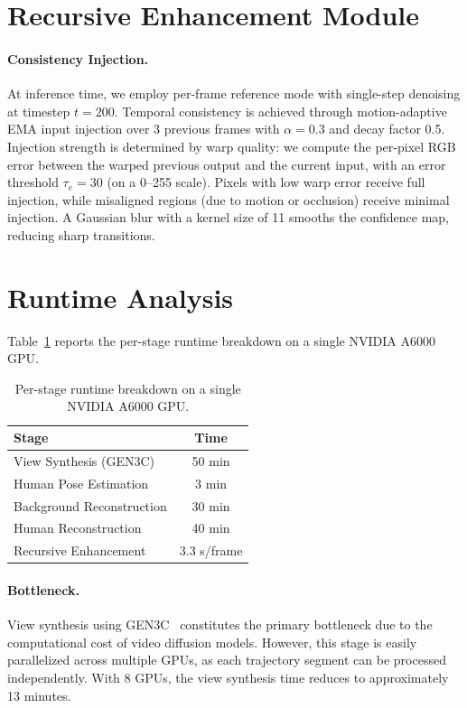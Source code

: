 \documentclass[acmtog]{acmart}
\begin{document}
\section{Recursive Enhancement Module}
\label{sec:appendix_refinement}

\paragraph{Consistency Injection.}
At inference time, we employ per-frame reference mode with single-step denoising at timestep $t=200$.
Temporal consistency is achieved through motion-adaptive EMA input injection over 3 previous frames with $\alpha = 0.3$ and decay factor 0.5.
Injection strength is determined by warp quality: we compute the per-pixel RGB error between the warped previous output and the current input, with an error threshold $\tau_e = 30$ (on a 0--255 scale).
Pixels with low warp error receive full injection, while misaligned regions (due to motion or occlusion) receive minimal injection.
A Gaussian blur with a kernel size of 11 smooths the confidence map, reducing sharp transitions.


\section{Runtime Analysis}
\label{sec:appendix_runtime}

Table~\ref{tab:runtime} reports the per-stage runtime breakdown on a single NVIDIA A6000 GPU.

\begin{table}[tbp]
\centering
\caption{Per-stage runtime breakdown on a single NVIDIA A6000 GPU.}
\label{tab:runtime}
\begin{tabular}{l|c}
\toprule
Stage & Time \\
\midrule
View Synthesis (GEN3C) & 50 min \\
Human Pose Estimation & 3 min \\
Background Reconstruction & 30 min \\
Human Reconstruction & 40 min \\
Recursive Enhancement & 3.3 s/frame \\
\bottomrule
\end{tabular}
\end{table}

\paragraph{Bottleneck.}
View synthesis using GEN3C~\cite{ren2025gen3c} constitutes the primary bottleneck due to the computational cost of video diffusion models. However, this stage is easily parallelized across multiple GPUs, as each trajectory segment can be processed independently. With 8 GPUs, the view synthesis time reduces to approximately 13 minutes.
\end{document}
